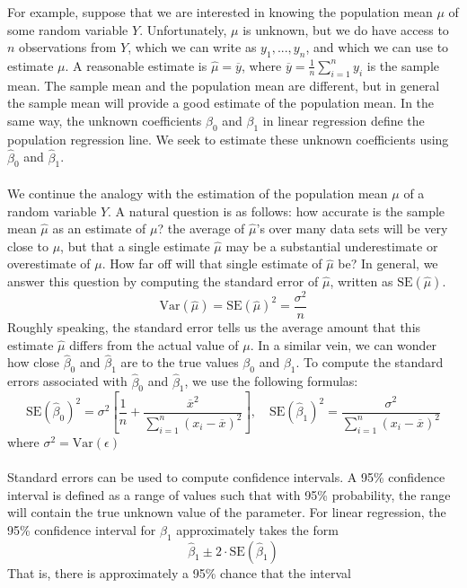 For example, suppose that we are interested in knowing the population mean $\mu$ of some random variable $Y$.  Unfortunately, $\mu$ is unknown, but we do have access to $n$ observations from $Y$, which we can write as $y_1,...,y_n$, and which we can use to estimate $\mu$. A reasonable estimate is $\hat{\mu} = \overline{y}$, where $\overline{y} = \frac{1}{n}\sum_{i=1}^n y_i$ is the sample mean. The sample mean and the population mean are different, but in general the sample mean will provide a good estimate of the population mean. In the same way, the unknown coefficients $\beta_0$ and $\beta_1$ in linear regression define the population regression line. We seek to estimate these unknown coefficients using $\hat{\beta}_0$ and $\hat{\beta}_1$.\\\\
We continue the analogy with the estimation of the population mean
$\mu$ of a random variable $Y$. A natural question is as follows: how accurate is the sample mean $\hat{\mu}$ as an estimate of $\mu$?  the average of $\hat{\mu}$’s over many data sets will be very close to $\mu$, but that a single estimate $\hat{\mu}$ may be a substantial underestimate or overestimate of $\mu$. How far off will that single estimate of $\hat{\mu}$ be?  In general, we answer this question by computing the standard error of $\hat{\mu}$, written as $\text{SE}(\hat{\mu})$.
\[\text{Var}(\hat{\mu}) = \text{SE}(\hat{\mu})^2 = \frac{\sigma^2}{n}\]
Roughly speaking, the standard error tells us the average amount that this estimate $\hat{\mu}$ differs from the actual value of $\mu$. In a similar vein, we can wonder how close $\hat{\beta}_0$
and $\hat{\beta}_1$ are to the true values $\beta_0$ and $\beta_1$. To compute the standard errors
associated with $\hat{\beta}_0$ and $\hat{\beta}_1$, we use the following formulas:
\[\text{SE}(\hat{\beta}_0)^2 = \sigma^2 \left[ \frac{1}{n} + \frac{\overline{x}^2}{\sum_{i=1}^n (x_i - \overline{x})^2}\right], \quad \text{SE}(\hat{\beta}_1)^2 = \frac{\sigma^2}{\sum_{i=1}^n (x_i - \overline{x})^2}\]
where $\sigma^2 = \text{Var}(\epsilon)$\\\\
Standard errors can be used to compute confidence intervals. A 95\% confidence interval is defined as a range of values such that with 95\% probability, the range will contain the true unknown value of the parameter. For linear regression, the 95\% confidence interval for $\beta_1$
approximately takes the form
\[\hat{\beta}_1 \pm 2 \cdot \text{SE}(\hat{\beta}_1)\]
That is, there is approximately a 95\% chance that the interval
